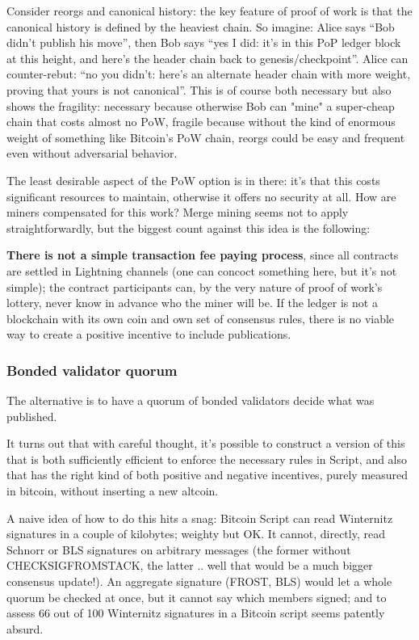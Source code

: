 \documentclass[11pt]{article}
\begin{document}
Consider reorgs and canonical history: the key feature of proof of work is that the canonical history is defined by the heaviest chain. So imagine: Alice says ``Bob didn't publish his move'', then Bob says ``yes I did: it's in this PoP ledger block at this height, and here's the header chain back to genesis/checkpoint''. Alice can counter-rebut: ``no you didn't: here's an alternate header chain with more weight, proving that yours is not canonical''. This is of course both necessary but also shows the fragility: necessary because otherwise Bob can "mine" a super-cheap chain that costs almost no PoW, fragile because without the kind of enormous weight of something like Bitcoin's PoW chain, reorgs could be easy and frequent even without adversarial behavior.

The least desirable aspect of the PoW option is in there: it's that this costs significant resources to maintain, otherwise it offers no security at all. How are miners compensated for this work? Merge mining seems not to apply straightforwardly, but the biggest count against this idea is the following:

\textbf{There is not a simple transaction fee paying process}, since all contracts are settled in Lightning channels (one can concoct something here, but it's not simple); the contract participants can, by the very nature of proof of work's lottery, never know in advance who the miner will be. If the ledger is not a blockchain with its own coin and own set of consensus rules, there is no viable way to create a positive incentive to include publications.

\subsubsection{Bonded validator quorum}

The alternative is to have a quorum of bonded validators decide what was published.

It turns out that with careful thought, it's possible to construct a version of this that is both sufficiently efficient to enforce the necessary rules in Script, and also that has the right kind of both positive and negative incentives, purely measured in bitcoin, without inserting a new altcoin.

A naive idea of how to do this hits a snag: Bitcoin Script can read Winternitz signatures in a couple of kilobytes; weighty but OK. It cannot, directly, read Schnorr or BLS signatures on arbitrary messages (the former without CHECKSIGFROMSTACK, the latter .. well that would be a much bigger consensus update!). An aggregate signature (FROST, BLS) would let a whole quorum be checked at once, but it cannot say which members signed; and to assess 66 out of 100 Winternitz signatures in a Bitcoin script seems patently absurd.
\end{document}
